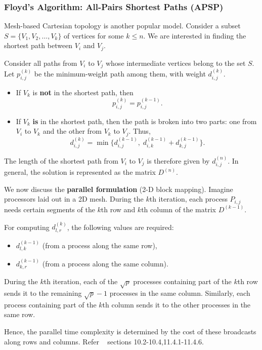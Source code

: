 \documentclass[12pt]{book}
\begin{document}
\subsubsection{Floyd's Algorithm: All-Pairs Shortest Paths (APSP)}
Mesh-based Cartesian topology is another popular model.  
Consider a subset $S=\{V_1,V_2,\ldots, V_k\}$ of vertices for some $k \leq n$.  
We are interested in finding the shortest path between $V_i$ and $V_j$.  

Consider all paths from $V_i$ to $V_j$ whose intermediate vertices belong to the set $S$.  
Let $p_{i,j}^{(k)}$ be the minimum-weight path among them, with weight $d_{i,j}^{(k)}$.  

\begin{itemize}
    \item If $V_k$ is \textbf{not} in the shortest path, then
    \[
        p_{i,j}^{(k)} = p_{i,j}^{(k-1)}.
    \]
    \item If $V_k$ \textbf{is} in the shortest path, then the path is broken into two parts:
    one from $V_i$ to $V_k$ and the other from $V_k$ to $V_j$. Thus,
    \[
        d_{i,j}^{(k)} = \min\{d_{i,j}^{(k-1)}, \; d_{i,k}^{(k-1)} + d_{k,j}^{(k-1)}\}.
    \]
\end{itemize}

The length of the shortest path from $V_i$ to $V_j$ is therefore given by $d_{i,j}^{(n)}$.  
In general, the solution is represented as the matrix $D^{(n)}$.  

\medskip
\noindent
We now discuss the \textbf{parallel formulation} (2-D block mapping).  
Imagine processors laid out in a 2D mesh. During the $k$th iteration, each process $P_{i,j}$ needs certain segments of the $k$th row and $k$th column of the matrix $D^{(k-1)}$.  

For computing $d_{l,r}^{(k)}$, the following values are required:
\begin{itemize}
    \item $d_{l,k}^{(k-1)}$ (from a process along the same row),
    \item $d_{k,r}^{(k-1)}$ (from a process along the same column).
\end{itemize}

During the $k$th iteration, each of the $\sqrt{p}$ processes containing part of the $k$th row sends it to the remaining $\sqrt{p}-1$ processes in the same column. Similarly, each process containing part of the $k$th column sends it to the other processes in the same row.  

Hence, the parallel time complexity is determined by the cost of these broadcasts along rows and columns. Refer ~\cite{kumar1994introduction} sections 10.2-10.4,11.4.1-11.4.6.
\end{document}
